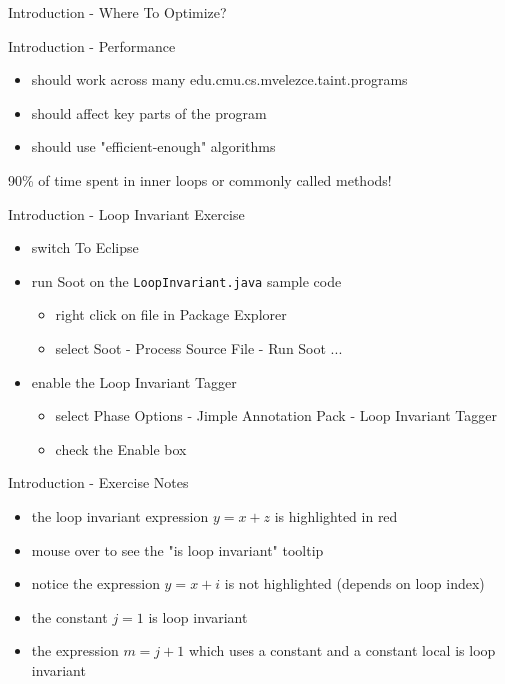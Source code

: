 \documentclass[mcgill,slideColor,colorBG,pdf]{prosper}
\begin{document}
\begin{slide} {Introduction - Where To Optimize?}
\end{slide}

\begin{slide} {Introduction - Performance}
\begin{itemize}
\item should work across many edu.cmu.cs.mvelezce.taint.programs
\item should affect key parts of the program
\item should use "efficient-enough" algorithms
\end{itemize}
90\% of time spent in inner loops or commonly called methods!
\end{slide}

\begin{slide} {Introduction - Loop Invariant Exercise}
\begin{itemize}
\item switch To Eclipse
\item run Soot on the \texttt{LoopInvariant.java} sample code
\begin{itemize}
\item right click on file in Package Explorer
\item select Soot - Process Source File - Run Soot ...
\end{itemize}
\item enable the Loop Invariant Tagger
\begin{itemize}
\item select Phase Options - Jimple Annotation Pack - Loop Invariant Tagger
\item check the Enable box
\end{itemize}
\end{itemize}
\end{slide}

\begin{slide} {Introduction - Exercise Notes}
\begin{itemize}
\item the loop invariant expression $y = x + z$ is highlighted in red
\item mouse over to see the "is loop invariant" tooltip
\item notice the expression $y = x + i$ is not highlighted (depends on loop index)
\item the constant $j = 1$ is loop invariant
\item the expression $m = j + 1$ which uses a constant and a constant local is loop invariant
\end{itemize}
\end{slide}
\end{document}
